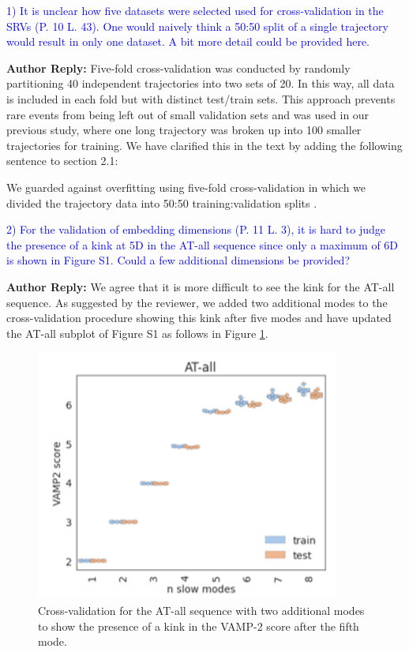 \documentclass[11pt,a4paper]{letter} %
\newcommand*{\rood}[1]{{\color{red}{#1}}}
\begin{document}
\textcolor{blue}{1)      It is unclear how five datasets were selected used for cross-validation in the SRVs (P. 10 L. 43). One would naively think a 50:50 split of a single trajectory would result in only one dataset. A bit more detail could be provided here.}

\textbf{Author Reply:}   Five-fold cross-validation was conducted by randomly partitioning 40 independent trajectories into two sets of 20. In this way, all data is included in each fold but with distinct test/train sets. This approach prevents rare events from being left out of small validation sets and was used in our previous study, where one long trajectory was broken up into 100 \citep{Sidky2019High-ResolutionVAMPnets} smaller trajectories for training. We have  clarified this in the text by adding the following sentence to section 2.1: 

We guarded against overfitting using five-fold cross-validation in which we divided the trajectory data into 50:50 training:validation splits \rood{such that random combinations of 20 trajectories were partitioned into each set}.\citep{Sidky2019High-ResolutionVAMPnets}

\textcolor{blue}{2)      For the validation of embedding dimensions (P. 11 L. 3), it is hard to judge the presence of a kink at 5D in the AT-all sequence since only a maximum of 6D is shown in Figure S1. Could a few additional dimensions be provided?}

\textbf{Author Reply:}   We agree that it is more difficult to see the kink for the AT-all sequence. As suggested by the reviewer, we added two additional modes to the cross-validation procedure showing this kink after five modes and have updated the AT-all subplot of Figure S1 as follows in Figure \ref{fig:AT-all_crossval}.

\begin{figure}[ht!]
	\begin{center}
        \includegraphics[width=100mm]{cover_letter/revision_figures/AT-all_added_modes.png}
        \caption{Cross-validation for the AT-all sequence with two additional modes to show the presence of a kink in the VAMP-2 score after the fifth mode.}
        \label{fig:AT-all_crossval}
	\end{center}
\end{figure}
\end{document}
